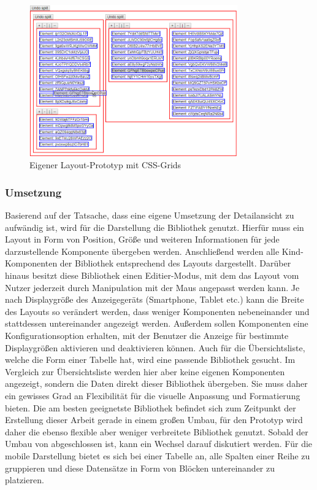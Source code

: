 \begin{figure}
    \centering
    \captionsetup{justification=centering}
    \includegraphics[width=0.8\textwidth]{figures/layout_grid_test.png}
        \caption{Eigener Layout-Prototyp mit CSS-Grids}\label{fig:layout_grid_test}
\end{figure}

\subsubsection{Umsetzung}\label{subsec:layout}
Basierend auf der Tatsache, dass eine eigene Umsetzung der Detailansicht zu aufwändig ist, wird für die Darstellung die Bibliothek  genutzt. Hierfür muss ein Layout in Form von Position, Größe und weiteren Informationen für jede darzustellende Komponente übergeben werden. Anschließend werden alle Kind-Komponenten der Bibliothek entsprechend des Layouts dargestellt. Darüber hinaus besitzt diese Bibliothek einen Editier-Modus, mit dem das Layout vom Nutzer jederzeit durch Manipulation mit der Maus angepasst werden kann. Je nach Displaygröße des Anzeigegeräts (Smartphone, Tablet etc.) kann die Breite des Layouts so verändert werden, dass weniger Komponenten nebeneinander und stattdessen untereinander angezeigt werden. Außerdem sollen Komponenten eine Konfigurationsoption erhalten, mit der Benutzer die Anzeige für bestimmte Displaygrößen aktivieren und deaktivieren können.
Auch für die Übersichtsliste, welche die Form einer Tabelle hat, wird eine passende Bibliothek gesucht. Im Vergleich zur Übersichtsliste werden hier aber keine eigenen Komponenten angezeigt, sondern die Daten direkt dieser Bibliothek übergeben. Sie muss daher ein gewisses Grad an Flexibilität für die visuelle Anpassung und Formatierung bieten. Die am besten geeignetste Bibliothek  befindet sich zum Zeitpunkt der Erstellung dieser Arbeit gerade in einem großen Umbau, für den Prototyp wird daher die ebenso flexible aber weniger verbreitete Bibliothek  genutzt. Sobald der Umbau von  abgeschlossen ist, kann ein Wechsel darauf diskutiert werden. Für die mobile Darstellung bietet es sich bei einer Tabelle an, alle Spalten einer Reihe zu gruppieren und diese Datensätze in Form von Blöcken untereinander zu platzieren.


